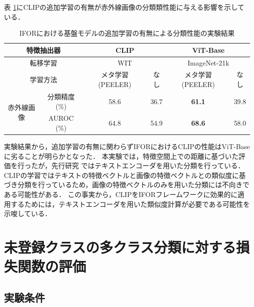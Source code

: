 表 \ref{tbl:exp3}にCLIPの追加学習の有無が赤外線画像の分類類性能に与える影響を示している．
% 
\begin{table}[tbp]
  \centering
  \caption{IFORにおける基盤モデルの追加学習の有無による分類性能の実験結果}
  \label{tbl:exp3}

  \begin{tabular}{cc||c|c|c|c}
      \hline
      \multicolumn{2}{c||}{特徴抽出器}      & \multicolumn{2}{c|}{CLIP} & \multicolumn{2}{c}{ViT-Base} \\ \hline
      \multicolumn{2}{c||}{転移学習}       &  \multicolumn{2}{c|}{WIT}  & \multicolumn{2}{c}{ImageNet-21k} \\ \hline
      \multicolumn{2}{c||}{学習方法}       & メタ学習 (PEELER) &   なし   & メタ学習 (PEELER) &    なし    \\ \hline\hline
      \multirow{2}{*}{赤外線画像} & 分類精度 (\%) &       58.6      &   36.7   &  \textbf{61.1}  &    39.8    \\
                                & AUROC (\%)   &       64.8      &   54.9   &  \textbf{68.6}  &    58.0    \\ \hline
  \end{tabular}
\end{table}
% 
実験結果から，追加学習の有無に関わらずIFORにおけるCLIPの性能はViT-Baseに劣ることが明らかとなった．
本実験では，特徴空間上での距離に基づいた評価を行ったが，先行研究 \cite{clip}ではテキストエンコーダを用いた分類を行っている．
CLIPの学習ではテキストの特徴ベクトルと画像の特徴ベクトルとの類似度に基づき分類を行っているため，画像の特徴ベクトルのみを用いた分類には不向きである可能性がある．
この事実から，CLIPをIFORフレームワークに効果的に適用するためには，テキストエンコーダを用いた類似度計算が必要である可能性を示唆している．

\section{未登録クラスの多クラス分類に対する損失関数の評価}

\subsection{実験条件}

